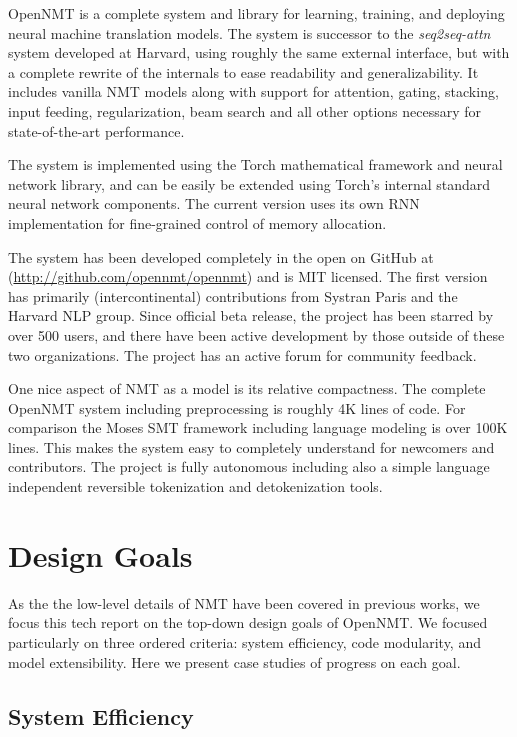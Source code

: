 \documentclass[11pt]{article}
\begin{document}
OpenNMT is a complete system and library for learning, training, and
deploying neural machine translation models. The system is successor
to the \textit{seq2seq-attn} system developed at Harvard, using
roughly the same external interface, but with a complete rewrite of
the internals to ease readability and generalizability. It includes
vanilla NMT models along with support for attention, gating, stacking,
input feeding, regularization, beam search and all other options necessary
for state-of-the-art performance.  

The system is implemented using the Torch mathematical framework and
neural network library, and can be easily be extended using Torch's
internal standard neural network components. The current version uses
its own RNN implementation for fine-grained control of memory
allocation. 

The system has been developed completely in the open on GitHub at
(\url{http://github.com/opennmt/opennmt}) and is MIT licensed.  The
first version has primarily (intercontinental) contributions from
Systran Paris and the Harvard NLP group. Since official beta release,
the project has been starred by over 500 users, and there have been
active development by those outside of these two organizations. The
project has an active forum for community feedback.


One nice aspect of NMT as a model is its relative compactness. The
complete OpenNMT system including preprocessing is roughly 4K lines of
code. For comparison the Moses SMT framework including language
modeling is over 100K lines. This makes the system easy to completely
understand for newcomers and contributors. The project is fully autonomous
including also a simple language independent reversible tokenization and
detokenization tools.



\section{Design Goals}


As the the low-level details of NMT have been covered in previous
works, we focus this tech report on the top-down design goals of
OpenNMT. We focused particularly on three ordered criteria:
system efficiency, code modularity, and model extensibility. 
Here we present case studies of progress on each goal.

\subsection{System Efficiency}
\end{document}
